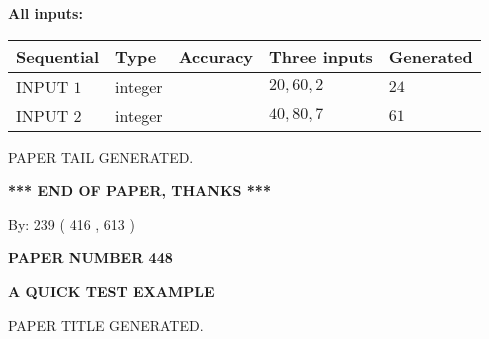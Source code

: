 \documentclass[12pt]{article}
\begin{document}
   
   
   
\noindent\vspace{0.1in}\hspace{-0.08in} {\textbf{\Large{All inputs: }}}
   
   
  
  
\noindent\begin{tabular}{|l|l|l|l|l|}
\hline
 Sequential & Type & Accuracy & Three inputs & Generated \\ 
\hline
 
 
  INPUT $  1 $ & integer &  & $
 20
 , 
 60
 , 
 2
 $ & $ 24 $ 
 \\  \hline  
 
 
  INPUT $  2 $ & integer &  & $
 40
 , 
 80
 , 
 7
 $ & $ 61 $ 
 \\  \hline  
 \end{tabular}
   
   
   
   
   
   
 \vspace{0.2in}
 
   
   
\vspace{2.0in} PAPER TAIL GENERATED.
   
   
   
   
\vspace{1.0in} 
{\textbf{\large{ *** END OF PAPER, THANKS *** }}} 
   
   
\hspace{1.0in} By: 
 239 ( 416 ,  613 )
   
   
   
   
\newpage 
\setcounter{page}{ 
   448001 } 
   
   
   
   
 {\textbf{ \Large{ PAPER NUMBER  448  }}}
   
   
\vspace{0.2in}
   
   
   
   
   
   
   
   
 \vspace{0.2in}
{\LARGE {\textbf{ A QUICK TEST EXAMPLE}}}
   
   
 PAPER TITLE GENERATED.
   
   
   
\vspace{0.2in}
   
\end{document}
